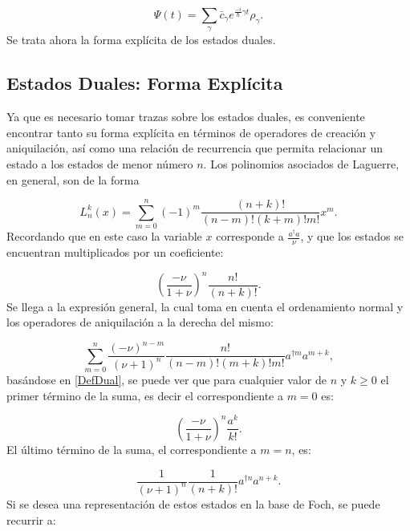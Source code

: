 \documentclass[a4paper,10pt]{report}
\begin{document}
\begin{equation}
\Psi(t) = \sum_\gamma \bar{c}_\gamma e^{\frac{-i}{\hbar} \gamma t} \rho_{\gamma}.
\end{equation} Se trata ahora la forma explícita de los estados duales.

\subsection{Estados Duales: Forma Explícita}

Ya que es necesario tomar trazas sobre los estados duales, es conveniente encontrar tanto su forma explícita en términos de operadores de creación y aniquilación, así como una relación de recurrencia que permita relacionar un estado a los estados de menor número $n$. Los polinomios asociados de Laguerre, en general, son de la forma\cite{ArfkenMM}

\begin{equation}\label{DefLaguerre}
L_n^k(x) = \sum_{m=0}^n (-1)^m \frac{(n+k)!}{(n-m)!(k+m)!m!} x^m.
\end{equation} Recordando que en este caso la variable $x$ corresponde a $\frac{a^\dagger a}{\nu}$, y que los estados se encuentran multiplicados por un coeficiente:

\begin{equation}
(\frac{-\nu}{1+\nu})^n \frac{n!}{(n+k)!}.
\end{equation}Se llega a la expresión general, la cual toma en cuenta el ordenamiento normal y los operadores de aniquilación a la derecha del mismo:

\begin{equation}\label{DefDual}
\sum_{m=0}^n \frac{(-\nu)^{n-m}}{(\nu+1)^n} \frac{n!}{(n-m)!(m+k)!m!} a^{\dagger m}a^{m+k},
\end{equation}basándose en \ref{DefDual}, se puede ver que para cualquier valor de $n$ y $k \geq 0$ el primer término de la suma, es decir el correspondiente a $m=0$ es:

\begin{equation}
(\frac{-\nu}{1+\nu})^n \frac{a^k}{k!}.
\end{equation} El último término de la suma, el correspondiente a $m=n$, es:

\begin{equation}
\frac{1}{(\nu+1)^n} \frac{1}{(n+k)!} a^{\dagger n}a^{n+k}.
\end{equation}Si se desea una representación de estos estados en la base de Foch, se puede recurrir a:
\end{document}
